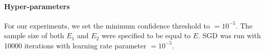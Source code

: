 \documentclass[akbc,twoside,11pt]{article}
\newcounter{example}
\newcommand{\algorithmname}{SafeLearner\xspace}
\begin{document}

\paragraph{Hyper-parameters}
For our experiments, we set the minimum confidence threshold to $= 10^{-5}$. The sample size of both $E_1$ and $E_2$ were specified to be equal to $E$. SGD was run with 10000 iterations with learning rate parameter $= 10^{-5}$.
\end{document}
